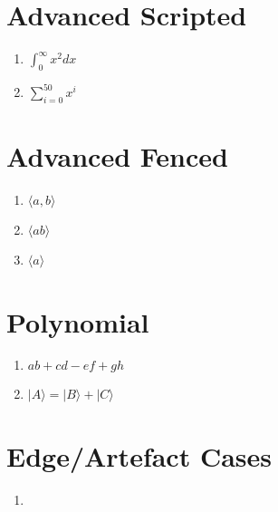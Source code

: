 \documentclass{article}
\begin{document}
\section{Advanced Scripted}
\begin{enumerate}
  \item $\int_0^\infty x^2 dx$
  \item $\sum_{i=0}^{50} x^i$
\end{enumerate}

\section{Advanced Fenced}
\begin{enumerate}
  \item $\langle a,b \rangle $ %
  \item $\langle ab \rangle $ %
  \item $\langle a \rangle$ %
\end{enumerate}

\section{Polynomial}
\begin{enumerate}
\item $ab + cd - ef + gh $
\item $|A\rangle = |B\rangle + |C\rangle$
\end{enumerate}

\section{Edge/Artefact Cases}
\begin{enumerate}
  \item $\,$  %
\end{enumerate}
\end{document}
